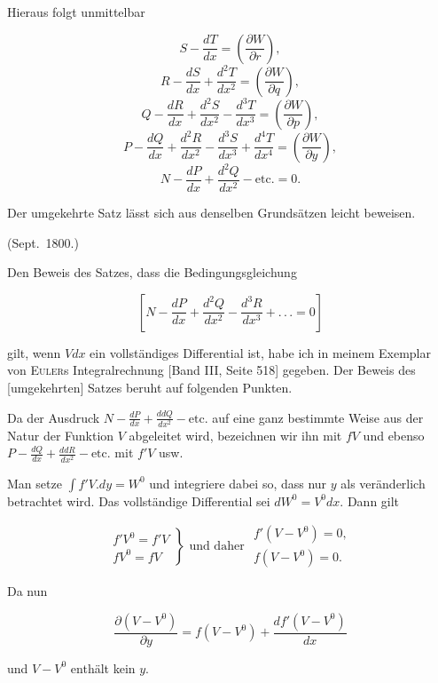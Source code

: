 Hieraus folgt unmittelbar

\[
S - \frac{dT}{dx} = \left(\frac{\partial W}{\partial r}\right),
\]
\[
R - \frac{dS}{dx} + \frac{d^2T}{dx^2} = \left(\frac{\partial W}{\partial q}\right),
\]
\[
Q - \frac{dR}{dx} + \frac{d^2S}{dx^2} - \frac{d^3T}{dx^3} = \left(\frac{\partial W}{\partial p}\right),
\]
\[
P - \frac{dQ}{dx} + \frac{d^2R}{dx^2} - \frac{d^3S}{dx^3} + \frac{d^4T}{dx^4} = \left(\frac{\partial W}{\partial y}\right),
\]
\[
N - \frac{dP}{dx} + \frac{d^2Q}{dx^2} - \text{etc.} = 0.
\]

Der umgekehrte Satz lässt sich aus denselben Grundsätzen leicht beweisen.

\noindent (Sept.\ 1800.)

\par\smallskip\hrulefill\smallskip\par

\noindent\hspace*{\parindent}Den Beweis des Satzes, dass die Bedingungsgleichung

\[
\left[N - \frac{dP}{dx} + \frac{d^2Q}{dx^2} - \frac{d^3R}{dx^3} + .\,.\,. = 0\right]
\]

\noindent gilt, wenn $Vdx$ ein vollständiges Differential ist, habe ich in meinem Exemplar von \textsc{Euler}s Integralrechnung [Band III, Seite 518] gegeben. Der Beweis des [umgekehrten] Satzes beruht auf folgenden Punkten.

Da der Ausdruck $N - \frac{dP}{dx} + \frac{ddQ}{dx^2} - \text{etc.}$ auf eine ganz bestimmte Weise aus der Natur der Funktion $V$ abgeleitet wird, bezeichnen wir ihn mit $fV$ und ebenso $P - \frac{dQ}{dx} + \frac{ddR}{dx^2} - \text{etc.}$ mit $f'V$ usw.

Man setze $\int f'V  .  dy = W^0$ und integriere dabei so, dass nur $y$ als veränderlich betrachtet wird. Das vollständige Differential sei $dW^0 = V^0dx$. Dann gilt

\[
\left.\begin{array}{l}
f'V^0 = f'V \\
fV^0 = fV
\end{array}\right\}
\text{ und daher }
\begin{array}{l}
f'(V - V^0) = 0, \\
f(V - V^0) = 0.
\end{array}
\]

\noindent Da nun

\[
\frac{\partial(V - V^0)}{\partial y} = f(V - V^0) + \frac{df'(V - V^0)}{dx}
\]

\noindent [gilt,. so gilt auch $\dfrac{\partial(V - V^0)}{\partial y} = 0$] und $V - V^0$ enthält kein $y$.

